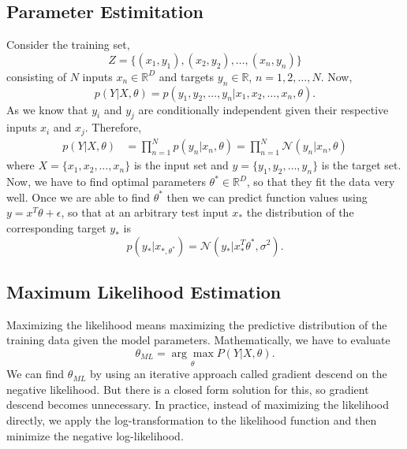 \documentclass[12pt]{article}
\numberwithin{equation}{section}
\begin{document}
\subsection{Parameter Estimitation}
Consider the training set,
\begin{equation*}
	Z=\{(x_{1},y_{1}), (x_{2},y_{2}), \dots, (x_{n},y_{n})\}
\end{equation*}
consisting of $N$ inputs $x_{n} \in \mathbb{R}^D$ and targets $y_{n} \in \mathbb{R}$, $n=1, 2, \dots, N$. Now, 
$$p(Y|X,\theta) = p(y_{1}, y_{2},\dots, y_{n}|x_{1}, x_{2}, \dots, x_{n}, \theta).$$
As we know that $y_{i}$ and $y_{j}$ are conditionally independent given their respective inputs $x_{i}$ and $x_{j}$. Therefore,
\begin{align*}
p(Y|X,\theta)&=\prod_{n=1}^{N} p(y_{n}|x_{n}, \theta)=\prod_{n=1}^{N} \mathcal{N}(y_{n}|x_{n}, \theta)
\end{align*}
where $X = \{x_{1}, x_{2}, \dots, x_{n}\}$ is the input set and $y = \{y_{1}, y_{2}, \dots, y_{n}\}$ is the target set. Now, we have to find optimal parameters $\theta^{*} \in \mathbb{R}^D$, so that they fit the data very well. Once we are able to find $\theta^{*}$ then we can predict function values using $y = x^T\theta + \epsilon$, so that at an arbitrary test input $x_{*}$ the distribution of the corresponding target $y_{*}$ is
\begin{equation*}
	p(y_{*}|x_{*, \theta^{*}})=\mathcal{N}(y_{*}|x_{*}^T\theta^*, \sigma^2).
\end{equation*}
\subsection{Maximum Likelihood Estimation}
Maximizing the likelihood means maximizing the predictive distribution of the training data given the model parameters. Mathematically, we have to evaluate
\begin{equation*}
	\theta_{ML} = \underset{\theta}{\arg\max}  P(Y|X,\theta).
\end{equation*}
We can find $\theta_{ML}$ by using an iterative approach called gradient descend on the negative likelihood. But there is a closed form solution for this, so gradient descend becomes unnecessary. In practice, instead of maximizing the likelihood directly, we apply the log-transformation to the likelihood function and then minimize the negative log-likelihood.
\end{document}
